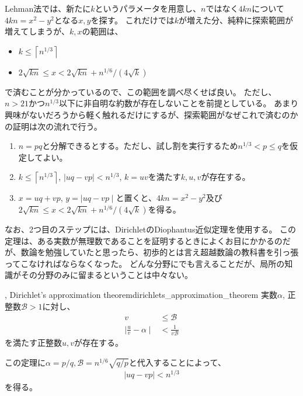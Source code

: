 Lehman法では、新たに$k$というパラメータを用意し、$n$ではなく$4kn$について$4kn=x^2-y^2$となる$x,y$を探す。
これだけでは$k$が増えた分、純粋に探索範囲が増えてしまうが、$k,x$の範囲は、
\begin{itemize}
\item $k \le \left \lceil n^{1/3}\right \rceil$
\item $2\sqrt{kn}\le x < 2\sqrt{kn}+n^{1/6}/(4\sqrt{k})$
\end{itemize}
で済むことが分かっているので、この範囲を調べ尽くせば良い。
ただし、$n>21$かつ$n^{1/3}$以下に非自明な約数が存在しないことを前提としている。
あまり興味がないだろうから軽く触れるだけにするが、探索範囲がなぜこれで済むのかの証明は次の流れで行う。
\begin{enumerate}
 \item $n=pq$と分解できるとする。ただし、試し割を実行するため$n^{1/3}<p\le q$を仮定してよい。
 \item $k \le \left \lceil n^{1/3}\right \rceil$, $\mid uq - vp \mid < n^{1/3}$, $k = uv$を満たす$k, u, v$が存在する。
 \item $x = uq + vp$, $y = \mid uq - vp \mid$と置くと、$4kn=x^2-y^2$及び$2\sqrt{kn}\le x < 2\sqrt{kn}+n^{1/6}/(4\sqrt{k})$を得る。
\end{enumerate}

なお、2つ目のステップには、DirichletのDiophantus近似定理を使用する。
この定理は、ある実数が無理数であることを証明するときによくお目にかかるのだが、数論を勉強していたと思ったら、初歩的とは言え超越数論の教科書を引っ張ってこなければならなくなった。
どんな分野にでも言えることだが、局所の知識がその分野のみに留まるということは中々ない。

\begin{Theo}{, Dirichlet's approximation theorem}{dirichlets_approximation_theorem}
実数$\alpha$, 正整数$\mathcal{B}>1$に対し、
\begin{align*}
v &\le \mathcal{B}\\
\mid \frac{u}{v} - \alpha \mid &< \frac{1}{v\mathcal{B}}
\end{align*}
を満たす正整数$u,v$が存在する。
\end{Theo}

この定理に$\alpha=p/q,\mathcal{B}=n^{1/6}\sqrt{q/p}$と代入することによって、
\begin{align*}
\mid uq - vp \mid < n^{1/3}
\end{align*}
を得る。
